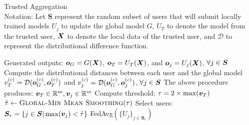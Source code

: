\documentclass{article} %
\begin{document}
\vspace{-10pt}
\begin{algorithm}[H]
\caption{Trusted Aggregation \\ 
Notation: Let ${\bm S}$ represent the random subset of users that will submit locally trained models $U_j$ to update the global model $G$, $U_T$ to denote the model from the trusted user, ${\bm{X}}$ to denote the local data of the trusted user, and $\mathcal{D}$ to represent the distributional difference function.
}
\label{alg:t-agg}
\begin{algorithmic}[1]

        \State Generated outputs: ${\bm{o}}_G = G({\bm{X}})$, ${\bm{o}}_{T} = U_T({\bm{X}})$, and ${\bm{o}}_j = U_j({\bm{X}})$, $\forall j \in {\bm{S}}$
            \State Compute the distributional distances between each user and the global model
            \State \quad $v^{(c)}_T = \mathcal{D}({\bm{o}}^{(c)}_G, {\bm{o}}^{(c)}_T)$ and $v^{(c)}_{j} = \mathcal{D}({\bm{o}}^{(c)}_G, {\bm{o}}^{(c)}_{j})$, $\forall j \in {\bm{S}}$
        \EndFor
        \State The above procedure produces: ${\bm{v}}_T\in{\mathbb{R}}^m, {\bm{v}}_j\in{\mathbb{R}}^m$
        \State Compute threshold: $\tau = 2 \times\max ( {\bm{v}}_T )$
        \State  $\tilde{\tau} \gets \Call{Global-Min Mean Smoothing}{\tau}$  
        \State Select users: ${\bm{S}}_r = \{j \in {\bm{S}} | \max({\bm{v}}_{j}) < \tilde{\tau} \}$
        \State \Return FedAvg$(\{U_j\}_{j \in {\bm S}_r})$ 
    \EndProcedure
\end{algorithmic}
\end{algorithm}
\vspace{-10pt}
\end{document}
